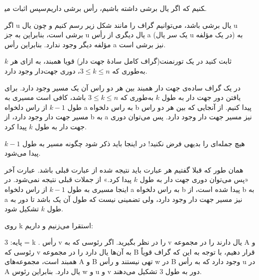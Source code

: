 \documentclass[11pt,largemargins]{h2wp}
\begin{document}
   
    سپس اثبات می‎کنیم که اگر یال برشی داشته باشیم، رأس برشی داریم.
    
    اگر u یال برشی باشد، می‌توانیم گراف را مانند شکل زیر رسم کنیم و چون یال u برشی است، بنابراین به جز u یال دیگری از رأس a (یک سر یال u در یک مؤلفه) به مؤلفه دیگر وجود ندارد. بنابراین رأس a نیز برشی است.
    
    
    \question
    
    ثابت کنید در یک تورنمنت(گراف کامل سادهٔ جهت‌ دار) قویا همبند، به ازای هر $k$ به‌طوری که $3 \leq k \leq n$، دوری جهت‌دار وجود دارد.
  
  \solution
  در یک گراف ساده‌ی جهت‌ دار همبند بین هر دو راس آن یک مسیر وجود دارد. برای یافتن دور جهت دار به طول $k$ به‌طوری که $ 3 \leq k \leq n $ باشد، کافی است مسیری به طول $ k-1 $ از راس دلخواه a به راس دلخواه b پیدا کنیم. از آنجایی که بین هر دو راس مسیر جهت دار وجود دارد، از  b به a نیز مسیر جهت دار وجود دارد. پس می‌توان دوری جهت دار به طول  $k$   پیدا کرد.
  
  \notes
  
  هیچ جمله‌ای را بدیهی فرض نکنید! در اینجا باید ذکر شود چگونه مسیر به طول $ k-1 $ پیدا می‌شود.
    
  همان طور که قبلا گفتیم هر عبارت باید نتیجه شده از عبارت قبلی باشد. عبارت آخر «پس می‌توان دوری جهت دار به طول  $k$   پیدا کرد.» از جملات قبلی نتیجه نمی‌شود.  در اینجا مسیری به طول $ k-1 $ از راس دلخواه a به راس دلخواه b پیدا شده است، از  b به a نیز مسیر جهت دار وجود دارد، ولی تضمینی نیست که طول آن یک باشد تا دور به طول    $k$  تشکیل شود.
  

    روی k استقرا می‌زنیم و داریم:
   
    پایه: 3 = k . رأس v را در نظر بگیرید. اگر رئوسی که به v یال دارند را در مجموعه A و رئوسی که v به آن‌ها یال دارد را در مجموعه B قرار دهیم، با توجه به این که گراف قویاً همبند است، مجموعه‌های A و B تهی نیستند و رأس w در B وجود دارد که به رأس u در A یال دارد. بنابراین رئوس w و u و v دور به طول 3 تشکیل می‌دهند.
    
    
    
\end{document}
